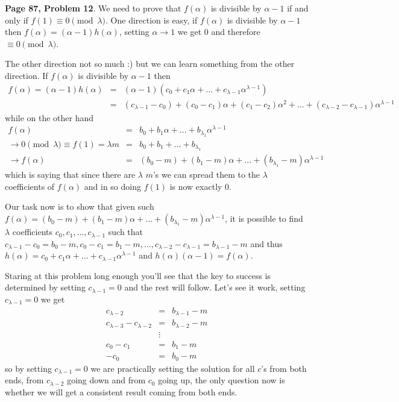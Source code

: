 \documentclass[aps,preprint,preprintnumbers,nofootinbib,showpacs,prd]{revtex4-1}
\newcommand{\nbea}{\begin{eqnarray*}}
\newcommand{\neea}{\end{eqnarray*}}
\begin{document}
{\bf Page 87, Problem 12}. We need to prove that $f(\alpha)$ is divisible by $\alpha - 1$ if and only if $f(1) \equiv 0 \pmod{\lambda}$. One direction is easy, if $f(\alpha)$ is divisible by $\alpha-1$ then $f(\alpha) = (\alpha - 1)h(\alpha)$, setting $\alpha \to 1$ we get $0$ and therefore $\equiv 0 \pmod{\lambda}$.

The other direction not so much :) but we can learn something from the other direction. If $f(\alpha)$ is divisible by $\alpha - 1$ then 
%
\nbea
f(\alpha) = (\alpha - 1)h(\alpha) & = & (\alpha - 1)(c_0 + c_1 \alpha + \dots + c_{\lambda-1}\alpha^{\lambda-1}) \\
& = & (c_{\lambda - 1} - c_0) + (c_0 - c_1)\alpha + (c_1 - c_2)\alpha^2 + \dots + (c_{\lambda-2} - c_{\lambda-1})\alpha^{\lambda - 1}
\neea
%
while on the other hand 
%
\nbea
f(\alpha) & = & b_0 + b_1\alpha + \dots + b_{\lambda_1}\alpha^{\lambda-1} \\
\to 0 \pmod{\lambda} \equiv f(1) = \lambda m & = & b_0 + b_1 + \dots + b_{\lambda_1} \\
\to f(\alpha) & = & (b_0 - m) + (b_1 - m)\alpha + \dots + (b_{\lambda_1} - m)\alpha^{\lambda-1}
\neea
%
which is saying that since there are $\lambda$ $m$'s we can spread them to the $\lambda$ coefficients of $f(\alpha)$ and in so doing $f(1)$ is now exactly 0.

Our task now is to show that given such $f(\alpha) = (b_0 - m) + (b_1 - m)\alpha + \dots + (b_{\lambda_1} - m)\alpha^{\lambda-1}$, it is possible to find $\lambda$ coefficients $c_0, c_1, \dots, c_{\lambda - 1}$ such that $c_{\lambda - 1} - c_0 = b_0 - m, c_0 - c_1 = b_1 - m, \dots, c_{\lambda-2} - c_{\lambda-1} = b_{\lambda - 1} - m$ and thus $h(\alpha) = c_0 + c_1 \alpha + \dots + c_{\lambda-1}\alpha^{\lambda-1}$ and $h(\alpha)(\alpha - 1) = f(\alpha)$.

Staring at this problem long enough you'll see that the key to success is determined by setting $c_{\lambda - 1} = 0$ and the rest will follow. Let's see it work, setting $c_{\lambda - 1} = 0$ we get
%
\nbea
c_{\lambda - 2} & = & b_{\lambda - 1} - m \\
c_{\lambda - 3} - c_{\lambda - 2} & = & b_{\lambda-2} - m \\
& \vdots & \\
c_0 - c_1 & = & b_1 - m \\
-c_0 & = & b_0 - m
\neea
%
so by setting $c_{\lambda - 1} = 0$ we are practically setting the solution for all $c$'s from both ends, from $c_{\lambda-2}$ going down and from $c_0$ going up, the only question now is whether we will get a consistent result coming from both ends.
\end{document}
